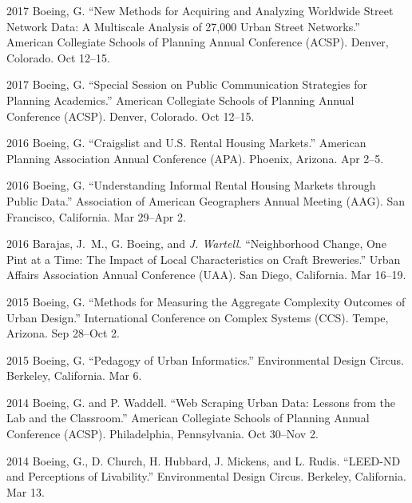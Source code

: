 \documentclass{academiccv}
\begin{document}
\begin{tablist}

\item[2017] \tab Boeing, G. \enquote{New Methods for Acquiring and Analyzing Worldwide Street Network Data: A Multiscale Analysis of 27,000 Urban Street Networks.} American Collegiate Schools of Planning Annual Conference (ACSP). Denver, Colorado. Oct 12--15.

\item[2017] \tab Boeing, G. \enquote{Special Session on Public Communication Strategies for Planning Academics.} American Collegiate Schools of Planning Annual Conference (ACSP). Denver, Colorado. Oct 12--15.

\item[2016] \tab Boeing, G. \enquote{Craigslist and U.S. Rental Housing Markets.} American Planning Association Annual Conference (APA). Phoenix, Arizona. Apr 2--5.

\item[2016] \tab Boeing, G. \enquote{Understanding Informal Rental Housing Markets through Public Data.} Association of American Geographers Annual Meeting (AAG). San Francisco, California. Mar 29--Apr 2.

\item[2016] \tab Barajas, J.~M., G. Boeing, and \textit{J. Wartell}. \enquote{Neighborhood Change, One Pint at a Time: The Impact of Local Characteristics on Craft Breweries.} Urban Affairs Association Annual Conference (UAA). San Diego, California. Mar 16--19.

\item[2015] \tab Boeing, G. \enquote{Methods for Measuring the Aggregate Complexity Outcomes of Urban Design.} International Conference on Complex Systems (CCS). Tempe, Arizona. Sep 28--Oct 2.

\item[2015] \tab Boeing, G. \enquote{Pedagogy of Urban Informatics.} Environmental Design Circus. Berkeley, California. Mar 6.

\item[2014] \tab Boeing, G. and P. Waddell. \enquote{Web Scraping Urban Data: Lessons from the Lab and the Classroom.} American Collegiate Schools of Planning Annual Conference (ACSP). Philadelphia, Pennsylvania. Oct 30--Nov 2.

\item[2014] \tab Boeing, G., D. Church, H. Hubbard, J. Mickens, and L. Rudis. \enquote{LEED-ND and Perceptions of Livability.} Environmental Design Circus. Berkeley, California. Mar 13.

\end{tablist}
\end{document}

